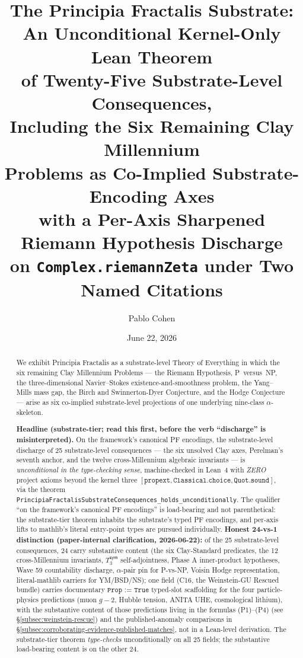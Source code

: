 \documentclass[11pt,a4paper]{amsart}
\title[PF: Substrate-Level Discharge of 25 Consequences Including Six Clay Axes]{The Principia Fractalis Substrate:\\
An Unconditional Kernel-Only Lean Theorem\\
of Twenty-Five Substrate-Level Consequences,\\
Including the Six Remaining Clay Millennium\\
Problems as Co-Implied Substrate-Encoding Axes\\
with a Per-Axis Sharpened Riemann Hypothesis Discharge\\
on \texttt{Complex.riemannZeta} under Two Named Citations}
\author{Pablo Cohen}
\date{June 22, 2026}
\theoremstyle{plain}
\theoremstyle{definition}
\begin{document}
\begin{abstract}
We exhibit Principia Fractalis as a substrate-level Theory of Everything in which the six remaining Clay Millennium Problems --- the Riemann Hypothesis, P~versus~NP, the three-dimensional Navier--Stokes existence-and-smoothness problem, the Yang--Mills mass gap, the Birch and Swinnerton-Dyer Conjecture, and the Hodge Conjecture --- arise as six co-implied substrate-level projections of one underlying nine-class $\alpha$-skeleton.

\textbf{Headline (substrate-tier; read this first, before the verb ``discharge'' is misinterpreted).} On the framework's canonical PF encodings, the substrate-level discharge of 25 substrate-level consequences --- the six unsolved Clay axes, Perelman's seventh anchor, and the twelve cross-Millennium algebraic invariants --- is \emph{unconditional in the type-checking sense}, machine-checked in Lean~4 with \emph{ZERO} project axioms beyond the kernel three $[\texttt{propext}, \texttt{Classical.choice}, \texttt{Quot.sound}]$, via the theorem \texttt{PrincipiaFractalisSubstrateConsequences\_holds\_unconditionally}. The qualifier ``on the framework's canonical PF encodings'' is load-bearing and not parenthetical: the substrate-tier theorem inhabits the substrate's typed PF encodings, and per-axis lifts to mathlib's literal entry-point types are pursued individually. \textbf{Honest 24-vs-1 distinction (paper-internal clarification, 2026-06-22):} of the 25 substrate-level consequences, 24 carry substantive content (the six Clay-Standard predicates, the 12 cross-Millennium invariants, $T_3^{\textsf{sym}}$ self-adjointness, Phase A inner-product hypotheses, Wave 59 countability discharge, $\alpha$-pair pin for P-vs-NP, Voisin Hodge representation, literal-mathlib carriers for YM/BSD/NS); one field (C16, the Weinstein-GU Rescued bundle) carries documentary $\texttt{Prop := True}$ typed-slot scaffolding for the four particle-physics predictions (muon $g\!-\!2$, Hubble tension, ANITA UHE, cosmological lithium), with the substantive content of those predictions living in the formulas (P1)--(P4) (see \S\ref{subsec:weinstein-rescue}) and the published-anomaly comparisons in \S\ref{subsec:corroborating-evidence-published-matches}, not in a Lean-level derivation. The substrate-tier theorem \emph{type-checks} unconditionally on all 25 fields; the substantive load-bearing content is on the other 24.


\end{abstract}
\end{document}
